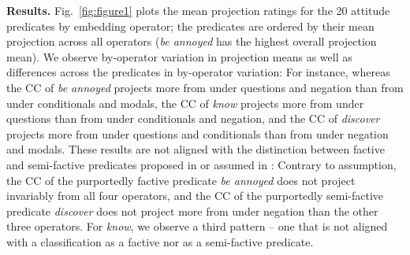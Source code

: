 \documentclass[12pt, a4paper]{scrartcl}
\begin{document}




\noindent
{\bf Results.} Fig.~\ref{fig:figure1} plots the mean projection ratings for the 20 attitude predicates by embedding operator; the predicates are ordered by their mean projection across all operators (\emph{be annoyed} has the highest overall projection mean). We observe by-operator variation in projection means as well as differences across the predicates in by-operator variation: For instance, whereas the CC of \emph{be annoyed} projects more from under questions and negation than from under conditionals and modals, the CC of \emph{know} projects more from under questions than from under conditionals and negation, and the CC of \emph{discover} projects more from under questions and conditionals than from under negation and modals. These results are not aligned with the distinction between factive and semi-factive predicates proposed in \citealt{karttunen_observations_1971} or assumed in \citealt{djarv_cognitive_2018}: Contrary to assumption, the CC of the purportedly factive predicate \emph{be annoyed} does not project invariably from all four operators, and the CC of the purportedly semi-factive predicate \emph{discover} does not project more from under negation than the other three operators. For {\em know}, we observe a third pattern -- one that is not aligned with a classification as a factive nor as a semi-factive predicate. 
\end{document}
